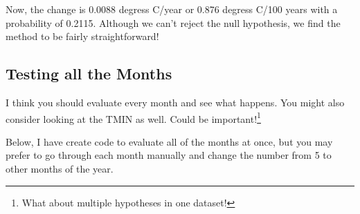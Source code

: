 \documentclass{article}\usepackage[]{graphicx}\usepackage[]{color}
\begin{document}
Now, the change is 0.0088 degress C/year or 0.876 degress C/100 years with a probability of 0.2115. Although we can't reject the null hypothesis, we find the method to be fairly straightforward! 


\subsection{Testing all the Months}

I think you should evaluate every month and see what happens. You might also consider looking at the TMIN as well. Could be important!\footnote{What about multiple hypotheses in one dataset!}

Below, I have create code to evaluate all of the months at once, but you may prefer to go through each month manually and change the number from 5 to other months of the year. 
\end{document}
